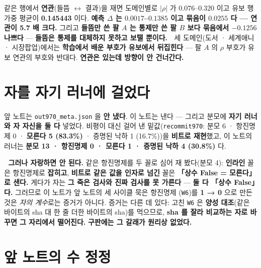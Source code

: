 \documentclass[10pt]{article}
\begin{document}
같은 행에서 \textbf{연관}(들뜸 $\leftrightarrow$ 결과)을 재면 도메인별로
$|\rho|$ 가 $0.076$--$0.320$ 이고 유보 행 가중 평균이 \textbf{0.145443} 이다. \textbf{예측 $\Delta$ 는 $0.0017$--$0.1385$ 이고 묶음이 $0.0255$ 다 --- 연관이 \textbf{5.7 배} 크다.}
그리고 \textbf{들뜸만 쓴 팔 $A$ 는 통제만 쓴 팔 $B$ 보다 묶음에서 $-0.1256$ 나쁘다} ---
\textbf{들뜸은 통제를 대체하지 못하고 보탤 뿐이다.}
🔴 세 도메인(도서 · 세계애니 · 시장팝업)에서는 \textbf{학습에서 배운 부호가 유보에서 뒤집힌다}
--- 팔 $A$ 의 $\rho$ 부호가 유보 연관의 부호와 반대다. \textbf{연관은 있는데 방향이 안 건너간다.}

\section{자를 자기 러너에 걸었다}


앞 노트는 \texttt{out970\_meta.json} 을 \textbf{안 냈다}. 이 노트는 낸다 ---
그리고 분모에 \textbf{자기 러너와 자 자신을 둘 다} 넣었다.
비평이 대신 걸어 낸 밑값(\texttt{recommit970}: 분모 6 · 항진명제 0 ·
\textbf{모른다 5 (83.3\%)} · 증명된 낙하 1 (16.7\%))을 \textbf{비트로 재현}했고,
이 노트의 러너는 \textbf{분모 13 · 항진명제 0 · 모른다 1 · 증명된 낙하 4 (30.8\%)} 다.

🔴 \textbf{그러나 자랑하면 안 된다.} 같은 항진명제를 두 꼴로 심어 재 봤다(분모 4):
\textbf{인라인} 꼴은 항진명제로 \textbf{잡히고}, \textbf{비트로 같은 값을 인자로 넘긴} 꼴은
\textbf{「상수 False = 모른다」로 샌다.} 게다가 자는 \textbf{그 죽은 검사와 진짜 검사를 못 가른다}
--- \textbf{둘 다 「상수 False」다.} 그러므로 이 노트가 앞 노트의 세 사이클 묵은 항진명제
(\texttt{W6})를 \textbf{1 → 0} 으로 만든 것은 \emph{자의 계수}로는 증거가 아니다.
증거는 다른 데 있다: 고친 \texttt{W6} 은 \textbf{양성 대조}(같은 바이트의 sha 대
한 줄 더한 바이트의 sha)를 먹으므로, \textbf{sha 를 잘라 비교하는 자로 바꾸면 그 자리에서
떨어진다.} \textbf{구판에는 그 갈래가 원리상 없었다.}

\section{앞 노트의 수 정정}

\end{document}

